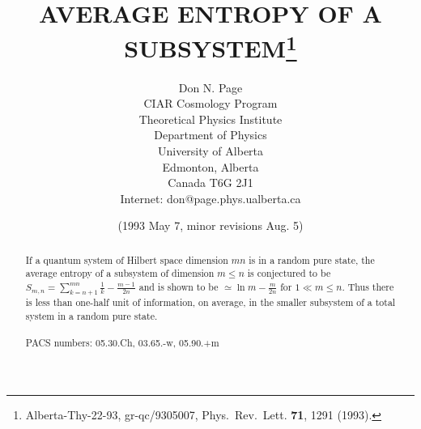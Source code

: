 \documentclass[12pt]{article}
\begin{document}
\title{AVERAGE ENTROPY OF A SUBSYSTEM\thanks
{Alberta-Thy-22-93, gr-qc/9305007, Phys.\ Rev.\ Lett. {\bf 71}, 1291
(1993).}}
\author{ Don N. Page\\
CIAR Cosmology Program\\
Theoretical Physics Institute\\
Department of Physics\\University of Alberta\\
Edmonton, Alberta\\Canada T6G 2J1\\
Internet:  don@page.phys.ualberta.ca}
\date{(1993 May 7, minor revisions Aug. 5)}
\maketitle
\large
\begin{abstract}
If a quantum system of Hilbert space dimension $mn$ is in a random
pure state,
the average entropy of a subsystem of dimension $m\leq n$ is
conjectured to be
$S_{m,n}=\sum_{k=n+1}^{mn}\frac{1}{k} - \frac{m-1}{2n}$ and is shown
to be
$\simeq \ln m - \frac{m}{2n}$ for $1\ll m\leq n$.  Thus there is less
than
one-half unit of information, on average, in the smaller subsystem of
a total
system in a random pure state.
\\
\\
PACS numbers: 05.30.Ch, 03.65.-w, 05.90.+m
\end{abstract}
\normalsize
\pagebreak
\end{document}
